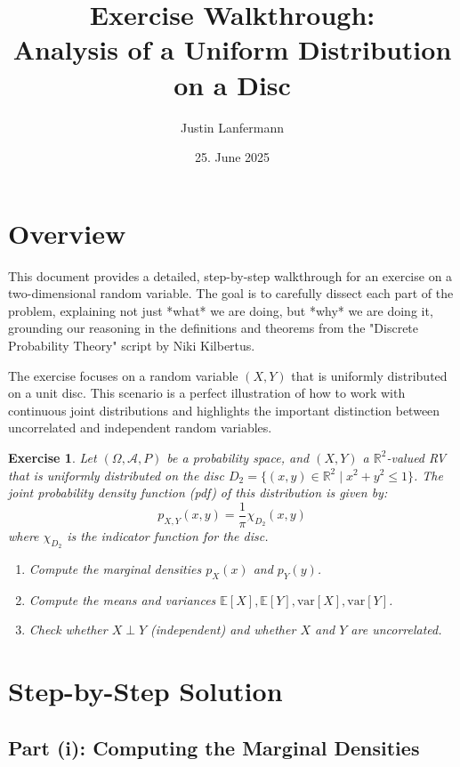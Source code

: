 \documentclass[11pt,a4paper]{article}
\title{\vspace{-2cm}Exercise Walkthrough: \\ Analysis of a Uniform Distribution on a Disc}
\author{Justin Lanfermann}
\date{25. June 2025}
\theoremstyle{mystyle}
\newtheorem*{exercise}{Exercise}
\begin{document}
\maketitle

\section*{Overview}

This document provides a detailed, step-by-step walkthrough for an exercise on a two-dimensional random variable. The goal is to carefully dissect each part of the problem, explaining not just *what* we are doing, but *why* we are doing it, grounding our reasoning in the definitions and theorems from the "Discrete Probability Theory" script by Niki Kilbertus.

The exercise focuses on a random variable $(X,Y)$ that is uniformly distributed on a unit disc. This scenario is a perfect illustration of how to work with continuous joint distributions and highlights the important distinction between uncorrelated and independent random variables.

\begin{exercise}
Let $(\Omega, \mathcal{A}, P)$ be a probability space, and $(X, Y)$ a $\mathbb{R}^2$-valued RV that is uniformly distributed on the disc
$D_2 = \{(x, y) \in \mathbb{R}^2 \mid x^2 + y^2 \leq 1\}$.
The joint probability density function (pdf) of this distribution is given by:
\[
p_{X,Y}(x, y) = \frac{1}{\pi} \chi_{D_2}(x, y)
\]
where $\chi_{D_2}$ is the indicator function for the disc.

\begin{enumerate}
    \item[(i)] Compute the marginal densities $p_X(x)$ and $p_Y(y)$.
    \item[(ii)] Compute the means and variances $\mathbb{E}[X], \mathbb{E}[Y], \text{var}[X], \text{var}[Y]$.
    \item[(iii)] Check whether $X \perp Y$ (independent) and whether $X$ and $Y$ are uncorrelated.
\end{enumerate}
\end{exercise}

\section{Step-by-Step Solution}

\subsection{Part (i): Computing the Marginal Densities}
\end{document}
